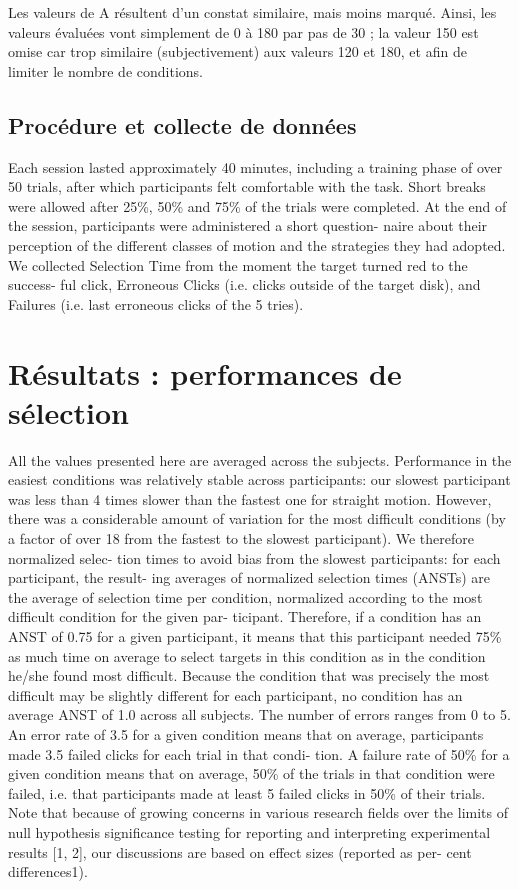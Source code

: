 	Les valeurs de A résultent d'un constat similaire, mais moins marqué. Ainsi, les valeurs évaluées vont simplement de 0\textdegree{} à 180\textdegree{} par pas de 30\textdegree{} ; la valeur 150\textdegree{} est omise car trop similaire (subjectivement) aux valeurs 120\textdegree{} et 180\textdegree{}, et afin de limiter le nombre de conditions.

	\subsection{Procédure et collecte de données}
Each session lasted approximately 40 minutes, including a training phase of over 50 trials, after which participants felt comfortable
with the task. Short breaks were allowed after 25\%{}, 50\%{} and 75\%{} of the trials were
completed. At the end of the session, participants were administered a short question-
naire about their perception of the different classes of motion and the strategies they
had adopted.
We collected Selection Time from the moment the target turned red to the success-
ful click, Erroneous Clicks (i.e. clicks outside of the target disk), and Failures (i.e.
last erroneous clicks of the 5 tries).

\section{Résultats : performances de sélection}
	All the values presented here are averaged across the subjects. Performance in the
easiest conditions was relatively stable across participants: our slowest participant
was less than 4 times slower than the fastest one for straight motion. However, there
was a considerable amount of variation for the most difficult conditions (by a factor
of over 18 from the fastest to the slowest participant). We therefore normalized selec-
tion times to avoid bias from the slowest participants: for each participant, the result-
ing averages of normalized selection times (ANSTs) are the average of selection time
per condition, normalized according to the most difficult condition for the given par-
ticipant. Therefore, if a condition has an ANST of 0.75 for a given participant, it
means that this participant needed 75\%{} as much time on average to select targets in
this condition as in the condition he/she found most difficult. Because the condition
that was precisely the most difficult may be slightly different for each participant, no
condition has an average ANST of 1.0 across all subjects.
The number of errors ranges from 0 to 5. An error rate of 3.5 for a given condition
means that on average, participants made 3.5 failed clicks for each trial in that condi-
tion. A failure rate of 50\%{} for a given condition means that on average, 50\%{} of the
trials in that condition were failed, i.e. that participants made at least 5 failed clicks in
50\%{} of their trials. Note that because of growing concerns in various research fields
over the limits of null hypothesis significance testing for reporting and interpreting
experimental results [1, 2], our discussions are based on effect sizes (reported as per-
cent differences1).

